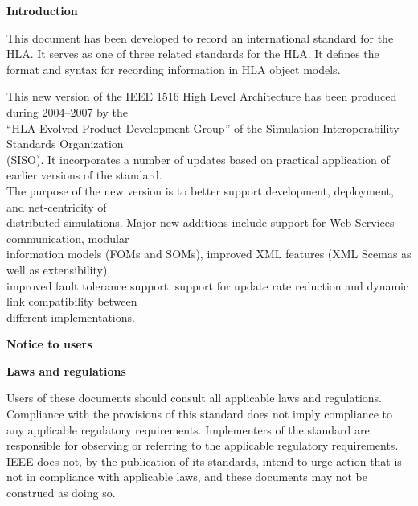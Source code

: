 \setcounter{page}{4}
\frontheaders
{\fmsans\bfseries\fontsize{14}{16}\selectfont Introduction\par}
\vspace{30pt}
{\setlength{\fboxsep}{2.5pt}\setlength{\fboxrule}{0.48pt}%
\noindent{}\par}
\vspace{2.5pt}
{\fmserif
This document has been developed to record an international standard for the HLA. It serves as one of three related standards for the HLA. It defines the format and syntax for recording information in HLA object models.\par
\vspace{12pt}
This new version of the IEEE 1516 High Level Architecture has been produced during 2004--2007 by the\\
``HLA Evolved Product Development Group'' of the Simulation Interoperability Standards Organization\\
(SISO). It incorporates a number of updates based on practical application of earlier versions of the standard.\\
The purpose of the new version is to better support development, deployment, and net-centricity of\\
distributed simulations. Major new additions include support for Web Services communication, modular\\
information models (FOMs and SOMs), improved XML features (XML Scemas as well as extensibility),\\
improved fault tolerance support, support for update rate reduction and dynamic link compatibility between\\
different implementations.\par
\vspace{12pt}
{\fmsans\bfseries\fontsize{12}{14}\selectfont Notice to users\par}
\vspace{19pt}
{\fmsans\bfseries\fontsize{11}{13}\selectfont Laws and regulations\par}
\vspace{12.5pt}
Users of these documents should consult all applicable laws and regulations. Compliance with the provisions of this standard does not imply compliance to any applicable regulatory requirements. Implementers of the standard are responsible for observing or referring to the applicable regulatory requirements. IEEE does not, by the publication of its standards, intend to urge action that is not in compliance with applicable laws, and these documents may not be construed as doing so.\par
}
